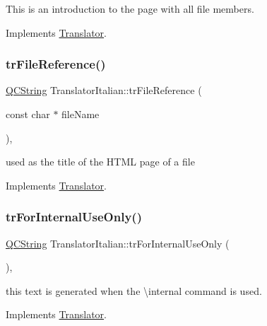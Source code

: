 This is an introduction to the page with all file members. 

Implements \mbox{\hyperlink{class_translator}{Translator}}.

\mbox{\label{class_translator_italian_aa335f444123ee1e447559746c8a41cd1}} 
\subsubsection{\texorpdfstring{trFileReference()}{trFileReference()}}
{\footnotesize\ttfamily \mbox{\hyperlink{class_q_c_string}{Q\+C\+String}} Translator\+Italian\+::tr\+File\+Reference (\begin{DoxyParamCaption}\item[{const char $\ast$}]{file\+Name }\end{DoxyParamCaption})\hspace{0.3cm}{\ttfamily [inline]}, {\ttfamily [virtual]}}

used as the title of the H\+T\+ML page of a file 

Implements \mbox{\hyperlink{class_translator}{Translator}}.

\mbox{\label{class_translator_italian_a7350dbcaece82544ae39e8a5f50ff72b}} 
\subsubsection{\texorpdfstring{trForInternalUseOnly()}{trForInternalUseOnly()}}
{\footnotesize\ttfamily \mbox{\hyperlink{class_q_c_string}{Q\+C\+String}} Translator\+Italian\+::tr\+For\+Internal\+Use\+Only (\begin{DoxyParamCaption}{ }\end{DoxyParamCaption})\hspace{0.3cm}{\ttfamily [inline]}, {\ttfamily [virtual]}}

this text is generated when the \textbackslash{}internal command is used. 

Implements \mbox{\hyperlink{class_translator}{Translator}}.

\mbox{\label{class_translator_italian_a0d67545dafd0468934dc6b10a3dc5fad}} 
